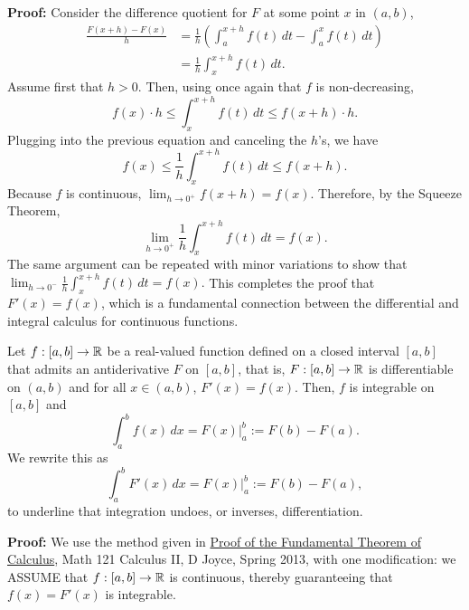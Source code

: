 \begin{enumerate}[label=\textbf{Claim \arabic*:},leftmargin=*]
   \textbf{Proof:}  Consider the difference quotient for $F$ at some point $x$ in $(a, b)$,
    $$
    \begin{aligned}
        \frac{F(x+h) - F(x)}{h} &= \frac{1}{h} \left( \int_a^{x+h} f(t) \, dt - \int_a^x f(t) \, dt \right) \\
        &=  \frac{1}{h} \int_x^{x+h} f(t) \, dt.
    \end{aligned}
    $$
    Assume first that $h>0$. Then, using once again that $f$ is non-decreasing, 
    $$f(x) \cdot h \le  \int_x^{x+h} f(t) \, dt \le f(x+h) \cdot h.$$
    Plugging into the previous equation and canceling the $h$'s, we have
    $$f(x) \le  \frac{1}{h} \int_x^{x+h} f(t) \, dt \le f(x+h). $$
    Because $f$ is continuous, $\lim_{h \to 0^+} f(x+h) = f(x)$. Therefore, by the Squeeze Theorem, 
    $$ \lim_{h \to 0^+} \frac{1}{h} \int_x^{x+h} f(t) \, dt = f(x).$$
    The same argument can be repeated with minor variations to show that $ \lim_{h \to 0^-} \frac{1}{h} \int_x^{x+h} f(t) \, dt = f(x).$
This completes the proof that $F'(x) = f(x)$, which is a fundamental connection between the differential and integral calculus for continuous functions. 
\end{enumerate}


\Qed


\begin{tcolorbox}[title=\textcolor{black}{Proof of Prop.~\ref{thm:FundamentalTheoremsCalculus} (Second Fundamental Theorem of Calculus)}, sharp corners, colback=green!30, colframe=green!80!blue, breakable, fonttitle=\bfseries]

Let \( f:[a, b] \to \mathbb R \) be a real-valued function defined on a closed interval \([a, b]\) that admits an antiderivative \( F \) on \([a, b]\), that is, $F:[a, b] \to \mathbb R$ is differentiable on $(a, b)$ and for all $x \in (a, b)$, $F'(x) = f(x)$. Then,  \( f \) is integrable on \([a, b]\) and
\begin{equation}
    \label{eq:SecondFundThmCalculusVo1B}
\int_a^b f(x) \, dx = F(x) \Big|_a^b := F(b) - F(a).
\end{equation}
We rewrite this as 
\begin{equation}
    \label{eq:SecondFundThmCalculusVo2B}
\int_a^b F'(x) \, dx = F(x) \Big|_a^b := F(b) - F(a), 
\end{equation}
to underline that integration undoes, or inverses, differentiation.
\end{tcolorbox}

\bigskip

\textbf{Proof:} We use the method given in \href{https://www2.clarku.edu/faculty/djoyce/ma121/FTCproof.pdf}{Proof of the Fundamental Theorem of Calculus}, Math 121 Calculus II, D Joyce, Spring 2013, with one modification: we ASSUME that $f:[a, b] \to \mathbb R$ is continuous, thereby guaranteeing that $f(x) = F'(x)$ is integrable.\\


